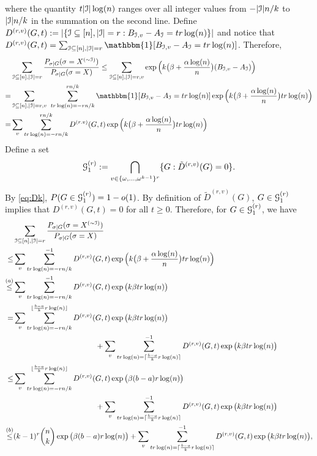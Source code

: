 \documentclass{article}
\begin{document}
where the quantity $t|\mathcal{I}|\log(n)$ ranges over all integer values from $-|\mathcal{I}|n/k$ to $|\mathcal{I}|n/k$ in the summation on the second line.
Define $D^{(r,v)}(G,t):=|\{\mathcal{I}\subseteq[n],|\mathcal{I}|=r: B_{\mathcal{I},v}-A_{\mathcal{I}}= tr\log(n)\}|$ and
notice that $D^{(r,v)}(G,t)=\sum_{\cI\subseteq[n],|\cI|=r} \mathbbm{1}[B_{\cI,v}-A_{\cI}= tr\log(n)]$.
Therefore,
\begin{align*}
 & \sum_{\cI\subseteq[n],|\cI|=r}
 \frac{P_{\sigma|G}(\sigma=X^{(\sim \cI)} )}
{P_{\sigma|G}(\sigma=X)}
\le \sum_{\cI\subseteq[n],|\cI|=r, v} \exp\Big(k\big(\beta+\frac{\alpha\log(n)}{n} \big) (B_{\cI, v}-A_{\cI}) \Big) \\
= & \sum_{\cI\subseteq[n],|\cI|=r, v}
\hspace*{0.05in}
\sum_{tr\log(n)=-rn/k}^{rn/k}
\mathbbm{1}[B_{\cI,v}-A_{\cI}=tr \log(n)] \exp\Big(k\big(\beta+\frac{\alpha\log(n)}{n} \big) tr \log(n) \Big) \\
= & \sum_{v}\sum_{tr\log(n)=-rn/k}^{rn/k}
D^{(r.v)}(G,t) \exp\Big(k\big(\beta+\frac{\alpha\log(n)}{n} \big) t r\log(n) \Big)
\end{align*}
Define a set 
\begin{equation} \label{eq:g1k}
\mathcal{G}_1^{(r)}:=\bigcap_{v \in \{\omega, \dots, \omega^{k-1}\}^r}\{G:\tilde{D}^{(r,v)}(G)=0\}.
\end{equation}
By \eqref{eq:Dk}, $P(G\in\mathcal{G}_1^{(r)})= 1-o(1)$. By definition of $\tilde{D}^{(r,v)}(G)$,
$G\in\mathcal{G}_1^{(r)}$ implies that $D^{(r,v)}(G,t)=0$ for all $t\ge 0$.
Therefore, for $G\in\mathcal{G}_1^{(r)}$, we have
\begin{equation} \label{eq:bk}
\begin{aligned}
& \sum_{\mathcal{I}\subseteq[n],|\mathcal{I}|=r}
\frac{P_{\sigma|G}(\sigma=X^{(\sim \mathcal{I})} )}
{P_{\sigma|G}(\sigma=X)} \\
\le & \sum_{v}\sum_{tr\log(n)=-rn/k}^{-1}
D^{(r,v)}(G,t) \exp\Big(k\big(\beta+\frac{\alpha\log(n)}{n} \big) t r \log(n) \Big)   \\
\overset{(a)}{\le} & \sum_v\sum_{tr\log(n)=-rn/k}^{-1}
D^{(r,v)}(G,t) \exp\big(k\beta t r \log(n) \big) \\
= & \sum_v \sum_{tr\log(n)=-rn/k}^{\lfloor\frac{b-a}{k}r\log(n) \rfloor} D^{(r,v)}(G,t) \exp\big(k\beta t r \log(n) \big) \\
& \hspace*{1.5in} + \sum_v \sum_{tr\log(n)=\lceil\frac{b-a}{k}r\log(n) \rceil}^{-1} D^{(r,v)}(G,t) \exp\big(k\beta t r \log(n) \big) \\
\le & \sum_v\sum_{tr\log(n)=-rn/k}^{\lfloor\frac{b-a}{k}r\log(n) \rfloor} D^{(r,v)}(G,t)
\exp\big(\beta(b-a)r\log(n) \big) \\
& \hspace*{1.5in} +\sum_v \sum_{tr\log(n)=\lceil\frac{b-a}{k}r\log(n) \rceil}^{-1} D^{(r,v)}(G,t) \exp\big(k\beta t r \log(n) \big)  \\
\overset{(b)}{\le} & (k-1)^r\binom{n}{k}
\exp\big(\beta(b-a) r \log(n) \big)  + \sum_v \sum_{tr\log(n)=\lceil\frac{b-a}{k}r\log(n) \rceil}^{-1} D^{(r,v)}(G,t) \exp\big(k\beta t r \log(n) \big),
\end{aligned}
\end{equation}
\end{document}
